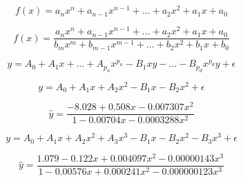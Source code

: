 \documentclass[12pt]{article}
\begin{document}
\pagestyle{empty}
\Large
{}
\pagecolor{ehandbook}

\boldmath
\[
f(x) = a_{n}x^{n} + a_{n-1}x^{n-1} + ... + a_{2}x^{2} + a_{1}x + a_{0}
\]

\hspace*{.5in}

\[
f(x) = \frac{a_{n}x^{n} + a_{n-1}x^{n-1} + ... + a_{2}x^{2} + a_{1}x + a_{0}} {b_{m}x^{m} + b_{m-1}x^{m-1} + ... + b_{2}x^{2} + b_{1}x + b_{0}}
\]

\hspace*{.5in}

\[
y = A_0 + A_1x + ... + A_{p_n}x^{p_n} - B_1xy - ...  - B_{p_d}x^{p_d}y + \epsilon
\]

\[
y = A_0 + A_1 x + A_2 x^2 - B_1 x - B_2 x^2 + \epsilon
\]

\[
\hat{y} = \frac{-8.028 + 0.508x - 0.007307x^{2}} {1 - 0.00704x - 0.0003288x^{2}}
\]

\[
y = A_0 + A_1 x + A_2 x^2 + A_3 x^3 - B_1 x - B_2 x^2 - B_3 x^3 + \epsilon
\]

\[
\hat{y} = \frac{1.079 - 0.122x + 0.004097x^{2} - 0.00000143x^{3}} {1 - 0.00576x + 0.000241x^{2} - 0.000000123x^{3}}
\]
\end{document}
